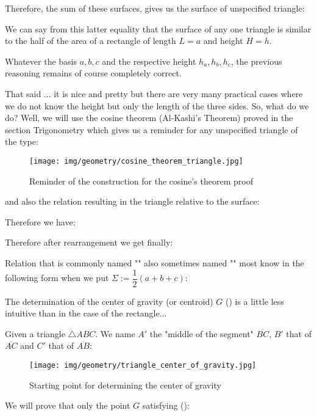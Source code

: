 {	Therefore, the sum of these surfaces, gives us the surface of unspecified triangle:
	
	We can say from this latter equality that the surface of any one triangle is similar to the half of the area of a rectangle of length $L=a$ and height $H=h$.
	\begin{tcolorbox}[title=Remark,colframe=black,arc=10pt]
	Whatever the basis $a, b, c$ and the respective height $h_a,h_b,h_c$, the previous reasoning remains of course completely correct.
	\end{tcolorbox}
	That said ... it is nice and pretty but there are very many practical cases where we do not know the height but only the length of the three sides. So, what do we do? Well, we will use the cosine theorem (Al-Kashi's Theorem) proved in the section Trigonometry which gives us a reminder for any unspecified triangle of the type:
	\begin{figure}[H]
		\centering
		\texttt{[image: img/geometry/cosine\_theorem\_triangle.jpg]}
		\caption{Reminder of the construction for the cosine's theorem proof}
	\end{figure}
	
	and also the relation resulting in the triangle relative to the surface:
	
	Therefore we have:
	
	Therefore after rearrangement we get finally:
	
	Relation that is commonly named "\label{heron formula}" also sometimes named "" most know in the following form when we put $\Sigma:=\dfrac{1}{2}\left(a+b+c\right)$:
	
	
	The determination of the center of gravity (or centroid) $G$ () is a little less intuitive than in the case of the rectangle...
	
	\begin{theorem}
	Given a triangle $\triangle ABC$. We name $A'$ the "middle of the segment" $\overline{BC}$, $B'$ that of $\overline{AC}$ and $C'$ that of $\overline{AB}$:
	\begin{figure}[H]
		\centering
		\texttt{[image: img/geometry/triangle\_center\_of\_gravity.jpg]}
		\caption{Starting point for determining the center of gravity}
	\end{figure}
	We will prove that only the point $G$ satisfying ():
	

\end{theorem}}
